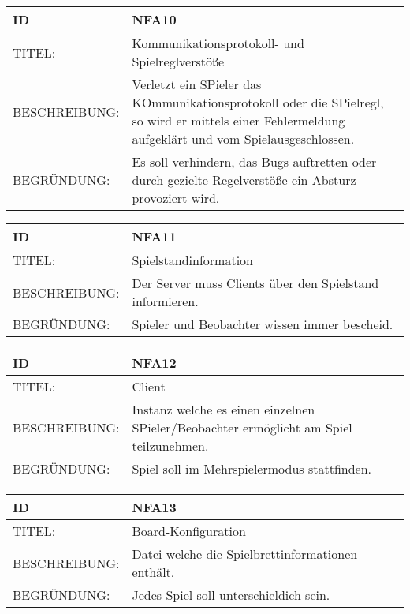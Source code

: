 \documentclass{uulm-assignment}
\begin{document}
    \begin{tabularx}{\textwidth}{|l|X |} \hline
        \textbf{ID} & \textbf{NFA10} \\
        \hline
        TITEL: &  Kommunikationsprotokoll- und Spielreglverstöße\\
        \hline
        BESCHREIBUNG: &  Verletzt ein SPieler das KOmmunikationsprotokoll oder die SPielregl, so wird er mittels einer Fehlermeldung aufgeklärt und vom Spielausgeschlossen.\\
        \hline
        BEGRÜNDUNG: &  Es soll verhindern, das Bugs auftretten oder durch gezielte Regelverstöße ein Absturz provoziert wird.\\
        \hline
    \end{tabularx}

    \begin{tabularx}{\textwidth}{|l|X |} \hline
        \textbf{ID} & \textbf{NFA11} \\
        \hline
        TITEL: &  Spielstandinformation\\
        \hline
        BESCHREIBUNG: &  Der Server muss Clients über den Spielstand informieren.\\
        \hline
        BEGRÜNDUNG: &  Spieler und Beobachter wissen immer bescheid.\\
        \hline
    \end{tabularx}

    \begin{tabularx}{\textwidth}{|l|X |} \hline
        \textbf{ID} & \textbf{NFA12} \\
        \hline
        TITEL: &  Client\\
        \hline
        BESCHREIBUNG: &  Instanz welche es einen einzelnen SPieler/Beobachter ermöglicht am Spiel teilzunehmen.\\
        \hline
        BEGRÜNDUNG: &  Spiel soll im Mehrspielermodus stattfinden.\\
        \hline
    \end{tabularx}

    \begin{tabularx}{\textwidth}{|l|X |} \hline
        \textbf{ID} & \textbf{NFA13} \\
        \hline
        TITEL: &  Board-Konfiguration\\
        \hline
        BESCHREIBUNG: &  Datei welche die Spielbrettinformationen enthält.\\
        \hline
        BEGRÜNDUNG: &  Jedes Spiel soll unterschieldich sein.\\
        \hline
    \end{tabularx}
\end{document}
